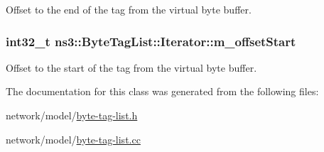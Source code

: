 Offset to the end of the tag from the virtual byte buffer. 

\subsubsection[{\texorpdfstring{m\+\_\+offset\+Start}{m_offsetStart}}]{\setlength{\rightskip}{0pt plus 5cm}int32\+\_\+t ns3\+::\+Byte\+Tag\+List\+::\+Iterator\+::m\+\_\+offset\+Start\hspace{0.3cm}{\ttfamily [private]}}\hypertarget{classns3_1_1ByteTagList_1_1Iterator_a9cee01030bde8d16fa4916ab99d6b47d}{}\label{classns3_1_1ByteTagList_1_1Iterator_a9cee01030bde8d16fa4916ab99d6b47d}


Offset to the start of the tag from the virtual byte buffer. 



The documentation for this class was generated from the following files\+:\begin{DoxyCompactItemize}
\item 
network/model/\hyperlink{byte-tag-list_8h}{byte-\/tag-\/list.\+h}\item 
network/model/\hyperlink{byte-tag-list_8cc}{byte-\/tag-\/list.\+cc}\end{DoxyCompactItemize}
